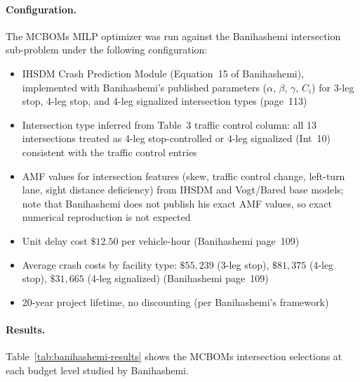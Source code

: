 \paragraph{Configuration.} The MCBOMs MILP optimizer was run against the
Banihashemi intersection sub-problem under the following configuration:
\begin{itemize}[leftmargin=2em, itemsep=2pt]
  \item IHSDM Crash Prediction Module (Equation~15 of Banihashemi),
    implemented with Banihashemi's published parameters ($\alpha$, $\beta$,
    $\gamma$, $C_i$) for 3-leg stop, 4-leg stop, and 4-leg signalized
    intersection types (page~113)
  \item Intersection type inferred from Table~3 traffic control column: all
    13 intersections treated as 4-leg stop-controlled or 4-leg signalized
    (Int~10) consistent with the traffic control entries
  \item AMF values for intersection features (skew, traffic control change,
    left-turn lane, sight distance deficiency) from IHSDM and Vogt/Bared
    base models; note that Banihashemi does not publish his exact AMF values,
    so exact numerical reproduction is not expected
  \item Unit delay cost $\$12.50$ per vehicle-hour (Banihashemi page~109)
  \item Average crash costs by facility type: $\$55{,}239$ (3-leg stop),
    $\$81{,}375$ (4-leg stop), $\$31{,}665$ (4-leg signalized)
    (Banihashemi page~109)
  \item 20-year project lifetime, no discounting (per Banihashemi's
    framework)
\end{itemize}

\paragraph{Results.} Table~\ref{tab:banihashemi-results} shows the MCBOMs
intersection selections at each budget level studied by Banihashemi.

